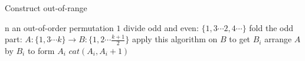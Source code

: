 \documentclass{article}
\begin{document}
	\begin{algorithm}[!h]
		\caption{Construct out-of-range}  
		\label{whatever}  
		\begin{algorithmic}
			\Require  
			n
			\Ensure  
			an out-of-order permutation
			\State\Return $1$
			\EndIf
			\State divide odd and even: $\{1,3\cdots2,4\cdots\}$
			\State fold the odd part: $A: \{1,3\cdots k\}\rightarrow B: \{1,2\cdots\frac{k+1}{2}\}$
			\State apply this algorithm on $B$ to get $B_i$
			\State arrange $A$ by $B_i$ to form $A_i$
			\State \Return $cat(A_i,A_i+1)$
		\end{algorithmic}  
	\end{algorithm}
\end{document}

